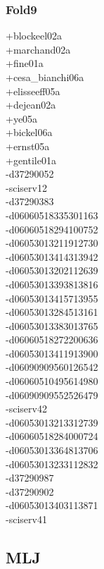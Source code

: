 \begin{multicols}{3}
\subsubsection*{Fold9}
+blockeel02a\\
+marchand02a\\
+fine01a\\
+cesa\_bianchi06a\\
+elisseeff05a\\
+dejean02a\\
+ye05a\\
+bickel06a\\
+ernst05a\\
+gentile01a\\
-d37290052\\
-sciserv12\\
-d37290383\\
-d06060518335301163\\
-d06060518294100752\\
-d06053013211912730\\
-d06053013414313942\\
-d06053013202112639\\
-d06053013393813816\\
-d06053013415713955\\
-d06053013284513161\\
-d06053013383013765\\
-d06060518272200636\\
-d06053013411913900\\
-d06090909560126542\\
-d06060510495614980\\
-d06090909552526479\\
-sciserv42\\
-d06053013213312739\\
-d06060518284000724\\
-d06053013364813706\\
-d06053013233112832\\
-d37290987\\
-d37290902\\
-d06053013403113871\\
-sciserv41

\clearpage
\subsection{MLJ}
\vspace{.5cm}


\end{multicols}
